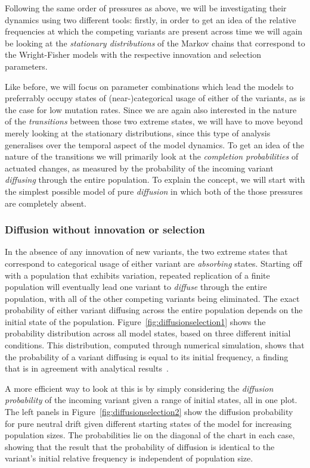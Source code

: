 Following the same order of pressures as above, we will be investigating their dynamics using two different tools: firstly, in order to get an idea of the relative frequencies at which the competing variants are present across time we will again be looking at the \emph{stationary distributions} of the Markov chains that correspond to the Wright-Fisher models with the respective innovation and selection parameters.

Like before, we will focus on parameter combinations which lead the models to preferrably occupy states of (near-)categorical usage of either of the variants, as is the case for low mutation rates. Since we are again also interested in the nature of the \emph{transitions} between those two extreme states, we will have to move beyond merely looking at the stationary distributions, since this type of analysis generalises over the temporal aspect of the model dynamics. To get an idea of the nature of the transitions we will primarily look at the \emph{completion probabilities} of actuated changes, as measured by the probability of the incoming variant \emph{diffusing} through the entire population. To explain the concept, we will start with the simplest possible model of pure \emph{diffusion} in which both of the those pressures are completely absent.

\subsubsection{Diffusion without innovation or selection}

In the absence of any innovation of new variants, the two extreme states that correspond to categorical usage of either variant are \emph{absorbing} states. Starting off with a population that exhibits variation, repeated replication of a finite population will eventually lead one variant to \emph{diffuse} through the entire population, with all of the other competing variants being eliminated. The exact probability of either variant diffusing across the entire population depends on the initial state of the population. Figure~\ref{fig:diffusionselection1} shows the probability distribution across all model states, based on three different initial conditions. This distribution, computed through numerical simulation, shows that the probability of a variant diffusing is equal to its initial frequency, a finding that is in agreement with analytical results~\citep{Clifford1973}.

A more efficient way to look at this is by simply considering the \emph{diffusion probability} of the incoming variant given a range of initial states, all in one plot. The left panels in Figure~\ref{fig:diffusionselection2} show the diffusion probability for pure neutral drift given different starting states of the model for increasing population sizes. The probabilities lie on the diagonal of the chart in each case, showing that the result that the probability of diffusion is identical to the variant's initial relative frequency is independent of population size.

